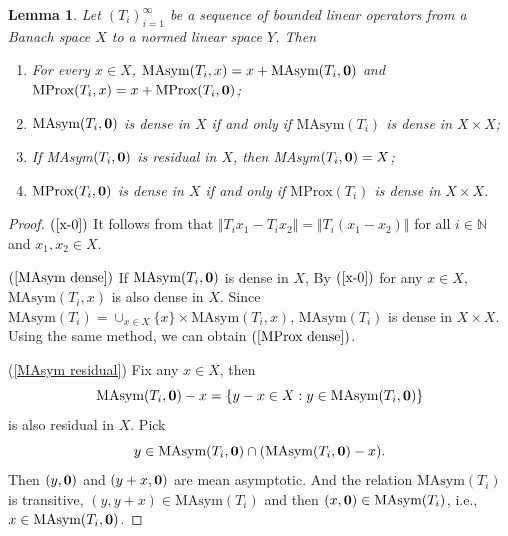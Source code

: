 \documentclass[12pt,a4paper]{amsart}
\theoremstyle{definition}
\theoremstyle{plain}
\newtheorem{lem}[defn]{Lemma}
\begin{document}
\begin{lem}\label{observations 1}
    Let $(T_i)_{i=1}^{\infty}$ be a sequence of bounded linear operators from a Banach space $X$ to a normed linear space $Y$. Then
    \begin{enumerate}
        \item \label{x-0}
              For every $x\in X$, $\text{MAsym}(T_i,x)=x+\text{MAsym}(T_i, {\bf 0})$ and
              $\text{MProx}(T_i,x)=x+\text{MProx}(T_i, {\bf 0})$;
        \item \label{MAsym dense}
              $\text{MAsym}(T_i, {\bf 0})$ is dense in $X$ if and only if
              $\text{MAsym}(T_i)$ is dense in $X\times X$;
        \item \label{MAsym residual}
              If MAsym$(T_i, {\bf 0})$ is residual in $X$, then MAsym$(T_i, {\bf 0})=X$;
        \item \label{MProx dense}
              $\text{MProx}(T_i, {\bf 0})$ is dense in $X$ if and only if
              $\text{MProx}(T_i)$ is dense in $X\times X$.
    \end{enumerate}
\end{lem}
\begin{proof}
    $(\ref{x-0})$ It follows from that $\Vert T_ix_1-T_ix_2 \Vert =\Vert T_i (x_1-x_2) \Vert$ for all $i\in \mathbb{N}$ and $x_1, x_2\in X$.
   
    $(\ref{MAsym dense})$ If $\text{MAsym}(T_i, {\bf 0})$ is dense in $X$, By $(\ref{x-0})$ for any $x\in X$, $\text{MAsym}(T_i, x)$ is also dense in $X$.
    Since $\text{MAsym}(T_i)=\cup_{x\in X} \{x\} \times \text{MAsym}(T_i, x)$, $\text{MAsym}(T_i)$ is dense in $X\times X$.
    Using the same method, we can obtain $(\ref{MProx dense})$.

    (\ref{MAsym residual}) Fix any $x\in X$, then
    \[
        \text{MAsym}(T_i, {\bf 0})-x=\{y-x\in X: y\in \text{MAsym}(T_i, {\bf 0})\}
    \]
    is also residual in $X$.
    Pick
    \[
        y\in \text{MAsym}(T_i, {\bf 0})\cap (\text{MAsym}(T_i, {\bf 0})-x).
    \]
    Then $(y, {\bf 0})$ and $(y+x, {\bf 0})$ are mean asymptotic.
    And the relation $ \text{MAsym}(T_i)$ is transitive, $(y, y+x)\in  \text{MAsym}(T_i)$
    and then $(x, {\bf 0})\in \text{MAsym}(T_i)$, i.e., $x\in \text{MAsym}(T_i, {\bf 0})$.
\end{proof}
\end{document}
